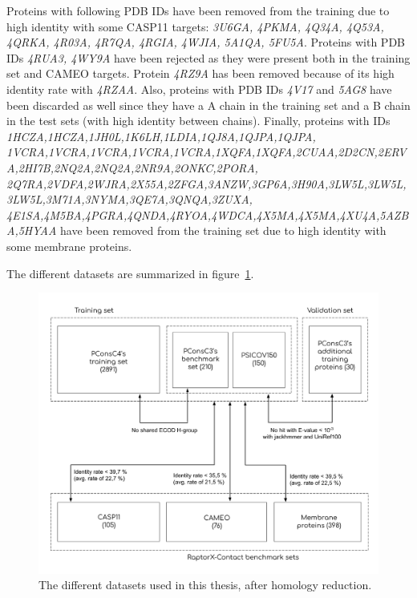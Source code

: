     Proteins with following PDB IDs have been removed from the training due to high
    identity with some CASP11 targets: \textit{3U6GA, 4PKMA, 4Q34A, 4Q53A, 4QRKA, 4R03A, 4R7QA,
    4RGIA, 4WJIA, 5A1QA, 5FU5A}.
    Proteins with PDB IDs \textit{4RUA3, 4WY9A} have been rejected as they were present
    both in the training set and CAMEO targets. Protein \textit{4RZ9A} has been removed
    because of its high identity rate with \textit{4RZAA}.
    Also, proteins with PDB IDs \textit{4V17} and \textit{5AG8} have been discarded as well
    since they have a A chain in the training set and a B chain in the test sets (with high identity
    between chains). Finally, proteins with IDs \textit{1HCZA,1HCZA,1JH0L,1K6LH,1LDIA,1QJ8A,1QJPA,1QJPA,
    1VCRA,1VCRA,1VCRA,1VCRA,1VCRA,1XQFA,1XQFA,2CUAA,2D2CN,2ERVA,2HI7B,2NQ2A,2NQ2A,2NR9A,2ONKC,2PORA,
    2Q7RA,2VDFA,2WJRA,2X55A,2ZFGA,3ANZW,3GP6A,3H90A,3LW5L,3LW5L,3LW5L,3M71A,3NYMA,3QE7A,3QNQA,3ZUXA,
    4E1SA,4M5BA,4PGRA,4QNDA,4RYOA,4WDCA,4X5MA,4X5MA,4XU4A,5AZBA,5HYAA} have been removed from the training
    set due to high identity with some membrane proteins.

    The different datasets are summarized in figure~\ref{homology_reduction}.

    \begin{figure}[H]
      \begin{center}
        \includegraphics[width=\textwidth, keepaspectratio]{imgs/datasets.png}
         \caption{The different datasets used in this thesis, after homology reduction.}
        \label{homology_reduction}
      \end{center}
    \end{figure}

